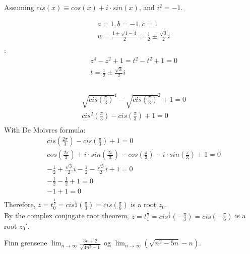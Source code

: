 \documentclass{myassignment}
\begin{document}
	Assuming $cis(x) \equiv cos(x) + i\cdot sin(x)$, and $i^2=-1$.
	\begin{answer}
		\begin{eqnarray}
			&a = 1, b = -1, c = 1 \\
			&w = \frac{1\pm\sqrt{1-4}}{2} = \frac{1}{2}\pm\frac{\sqrt{3}}{2}i\\
		\end{eqnarray}
		:\\
		\begin{eqnarray}
			&z^4 - z^2 + 1 = t^2-t^2+1 = 0\\
			&t = {\frac{1}{2}\pm\frac{\sqrt{3}}{2}i}\\
		\end{eqnarray}
		\\
		\begin{eqnarray}
			&\sqrt{cis(\frac{\pi}{3})}^4 - \sqrt{cis(\frac{\pi}{3})}^2 + 1 = 0\\
			&cis^2(\frac{\pi}{3}) - cis(\frac{\pi}{3}) + 1 = 0\\
		\end{eqnarray}
		With De Moivres formula:
		\begin{eqnarray}
			&cis(\frac{2\pi}{3}) - cis(\frac{\pi}{3}) + 1 = 0\\
			&cos(\frac{2\pi}{3}) + i\cdot sin(\frac{2\pi}{3}) - cos(\frac{\pi}{3}) - i\cdot sin(\frac{\pi}{3}) + 1 = 0\\
			&-\frac{1}{2} + \frac{\sqrt{3}}{2}i - \frac{1}{2} - \frac{\sqrt{3}}{2} i + 1 = 0\\
			&-\frac{1}{2} - \frac{1}{2} + 1 = 0\\
			&-1 + 1 = 0\\
		\end{eqnarray}
		Therefore, $z = t_0^{\frac{1}{2}} = cis^{\frac{1}{2}}(\frac{\pi}{3}) = cis(\frac{\pi}{6})$ is a root $z_0$.\\
		By the complex conjugate root theorem, $z=t_1^{\frac{1}{2}}=cis^{\frac{1}{2}}(-\frac{\pi}{3})=cis(-\frac{\pi}{6})$ is a root $z_0'$.\\
	\end{answer}


	\pagebreak
	\begin{problem}
		Finn grensene $\lim_{n \rightarrow \infty}\frac{3n + 2}{\sqrt{4n^2 - 1}}$ og $\lim_{n\rightarrow\infty}(\sqrt{n^2 - 5n} - n)$.
	\end{problem}
\end{document}
